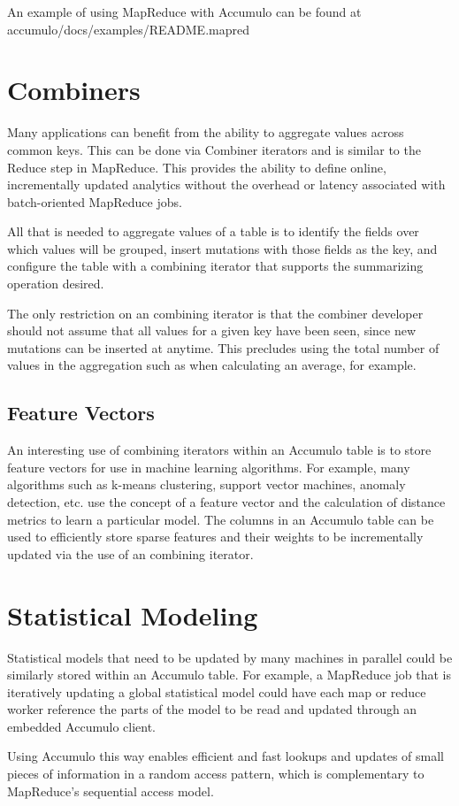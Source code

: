 An example of using MapReduce with Accumulo can be found at\\
accumulo/docs/examples/README.mapred

\section{Combiners}

Many applications can benefit from the ability to aggregate values across common
keys. This can be done via Combiner iterators and is similar to the Reduce step in
MapReduce. This provides the ability to define online, incrementally updated
analytics without the overhead or latency associated with batch-oriented
MapReduce jobs.

All that is needed to aggregate values of a table is to identify the fields over which
values will be grouped, insert mutations with those fields as the key, and configure
the table with a combining iterator that supports the summarizing operation
desired.

The only restriction on an combining iterator is that the combiner developer
should not assume that all values for a given key have been seen, since new
mutations can be inserted at anytime. This precludes using the total number of
values in the aggregation such as when calculating an average, for example.

\subsection{Feature Vectors}

An interesting use of combining iterators within an Accumulo table is to store
feature vectors for use in machine learning algorithms. For example, many
algorithms such as k-means clustering, support vector machines, anomaly detection,
etc. use the concept of a feature vector and the calculation of distance metrics to
learn a particular model. The columns in an Accumulo table can be used to efficiently
store sparse features and their weights to be incrementally updated via the use of an
combining iterator.

\section{Statistical Modeling}

Statistical models that need to be updated by many machines in parallel could be
similarly stored within an Accumulo table. For example, a MapReduce job that is
iteratively updating a global statistical model could have each map or reduce worker
reference the parts of the model to be read and updated through an embedded
Accumulo client.

Using Accumulo this way enables efficient and fast lookups and updates of small
pieces of information in a random access pattern, which is complementary to
MapReduce's sequential access model.

